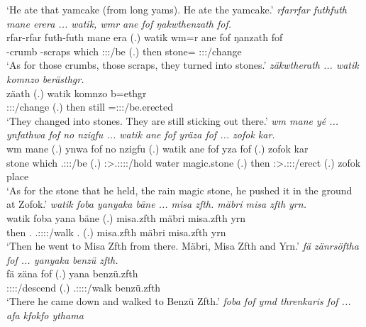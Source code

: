 \begin{exe}
	\trans `He ate that yamcake (from long yams). He ate the yamcake.'
	\emph{rfarrfar futhfuth mane erera ... watik, wmr ane fof ŋakwthenzath fof.}\\
	\gll rfar-rfar futh-futh mane era (.) watik wm=r ane fof ŋanzath fof\\ 
	\Redup-crumb{} \Redup-scraps which \Sg:\Sbj:\Pst:\Ipfv/be (.) then stone={\Purp} {\Dem} {\Emph} \Stpl:\Sbj:\Pst:\Ipfv/change {\Emph}\\
	\trans `As for those crumbs, those scraps, they turned into stones.'
	\emph{zäkwtherath ... watik komnzo berästhgr.}\\
	\gll zäath (.) watik komnzo b=ethgr\\ 
	\Stpl:\Sbj:\Pst:\Pfv/change (.) then still \Med=\Stpl:\Sbj:\Nonpast:\Stat/be.erected\\
	\trans `They changed into stones. They are still sticking out there.'
	\emph{wm mane yé ... ynfathwa fof no nzigfu ... watik ane fof yräza fof ... zofok kar.}\\
	\gll wm mane  (.) ynwa fof no nzigfu (.) watik ane fof yza fof (.) zofok kar\\ 
	stone which \Tsg.\Masc:\Sbj:\Nonpast:\Ipfv/be (.) \Sg:\Sbj>\Tsg.\Masc:\Obj:\Pst:\Ipfv:\Venit/hold {\Emph} water magic.stone (.) then {\Dem} {\Emph} \Sg:\Sbj>\Tsg.\Masc:\Obj:\Nonpast:\Ipfv/erect {\Emph} (.) zofok place\\
	\trans `As for the stone that he held, the rain magic stone, he pushed it in the ground at Zofok.'
	\emph{watik foba yanyaka bäne ... misa zfth. mäbri misa zfth yrn.}\\
	\gll watik foba yana bäne (.) {misa.zfth} mäbri {misa.zfth} yrn\\ 
	then \Dist.{\Abl} \Tsg.\Masc:\Sbj:\Pst:\Ipfv:\Venit/walk \Recog.{\Abs} (.) {misa.zfth} mäbri {misa.zfth} yrn\\
	\trans `Then he went to Misa Zfth from there. Mäbri, Misa Zfth and Yrn.'
	\emph{fä zänrsöftha fof ... yanyaka benzü zfth.}\\
	\gll fä zäna fof (.) yana {benzü.zfth}\\ 
	{\Dist} \Sg:\Sbj:\Pst:\Pfv:\Venit/descend {\Emph} (.) \Tsg.\Masc:\Sbj:\Pst:\Ipfv:\Venit/walk {benzü.zfth}\\
	\trans `There he came down and walked to Benzü Zfth.'
	\emph{foba fof ymd threnkaris fof ... afa kfokfo ythama}\\

\end{exe}
